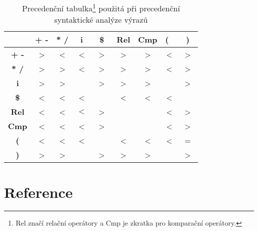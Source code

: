 \documentclass[a4paper,12pt]{article}
\begin{document}
\begin{table}[h]
	\centering
	\begin{tabular}{|c|c|c|c|c|c|c|c|c|} 
		\hline
		                      & \textbf{+ -}   & \textbf{* /}   & \textbf{i}  & \textbf{~\$~}  & \textbf{Rel}   & \textbf{Cmp}   & \textbf{(}~ & \textbf{~)~}   \\ 
		\hline
		\textbf{\textbf{+ -}} & \textgreater{} & \textless{}    & \textless{} & \textgreater{} & \textgreater{} & \textgreater{} & \textless{} & \textgreater{} \\ 
		\hline
		\textbf{\textbf{* /}} & \textgreater{} & \textgreater{} & \textless{} & \textgreater{} & \textgreater{} & \textgreater{} & \textless{} & \textgreater{} \\ 
		\hline
		\textbf{\textbf{i}}   & \textgreater{} & \textgreater{} &             & \textgreater{} & \textgreater{} & \textgreater{} &             & \textgreater{} \\ 
		\hline
		\textbf{\textbf{\$}}  & \textless{}    & \textless{}    & \textless{} &                & \textless{}    & \textless{}    & \textless{} &                \\ 
		\hline
		\textbf{\textbf{Rel}} & \textless{}    & \textless{}    & $<$         & \textgreater{} &                &                & \textless{} & \textgreater{} \\ 
		\hline
		\textbf{\textbf{Cmp}} & \textless{}    & \textless{}    & \textless{} & \textgreater{} &                &                & \textless{} & \textgreater{} \\ 
		\hline
		\textbf{\textbf{(}}   & \textless{}    & \textless{}    & \textless{} &                & \textless{}    & \textless{}    & \textless{} & =              \\ 
		\hline
		\textbf{\textbf{)}}   & \textgreater{} & \textgreater{} &             & \textgreater{} & \textgreater{} & \textgreater{} &             & \textgreater{} \\
		\hline
	\end{tabular}
	\begin{minipage}{\textwidth}
		\vspace{1.5em}
		\caption{Precedenční tabulka\protect\footnote[7]{Rel značí relační operátory a Cmp je zkratka pro komparační operátory.} použitá při precedenční syntaktické analýze výrazů}
		\label{table:prec_table}
	\end{minipage}
\end{table}
\clearpage

\section{Reference}
\nocite{*}
\printbibliography[heading=none]
\end{document}
